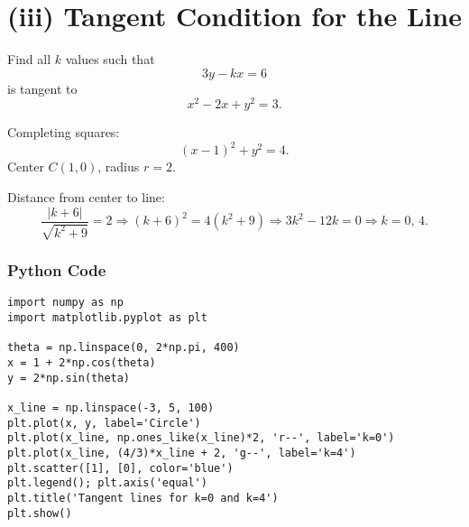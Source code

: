 \documentclass[10pt,twocolumn]{article}
\begin{document}
\section*{(iii) Tangent Condition for the Line}

\begin{tcolorbox}
Find all $k$ values such that
\[
3y - kx = 6
\]
is tangent to
\[
x^{2} - 2x + y^{2} = 3.
\]
\end{tcolorbox}

Completing squares:
\[
(x-1)^{2} + y^{2} = 4.
\]
Center \(C(1,0)\), radius \(r=2.\)

Distance from center to line:
\[
\frac{|k+6|}{\sqrt{k^{2}+9}} = 2
\Rightarrow (k+6)^{2} = 4(k^{2}+9)
\Rightarrow 3k^{2}-12k=0
\Rightarrow \boxed{k=0,\,4.}
\]

\begin{center}
\end{center}

\subsubsection*{Python Code}
\begin{verbatim}
import numpy as np
import matplotlib.pyplot as plt

theta = np.linspace(0, 2*np.pi, 400)
x = 1 + 2*np.cos(theta)
y = 2*np.sin(theta)

x_line = np.linspace(-3, 5, 100)
plt.plot(x, y, label='Circle')
plt.plot(x_line, np.ones_like(x_line)*2, 'r--', label='k=0')
plt.plot(x_line, (4/3)*x_line + 2, 'g--', label='k=4')
plt.scatter([1], [0], color='blue')
plt.legend(); plt.axis('equal')
plt.title('Tangent lines for k=0 and k=4')
plt.show()
\end{verbatim}
\end{document}
